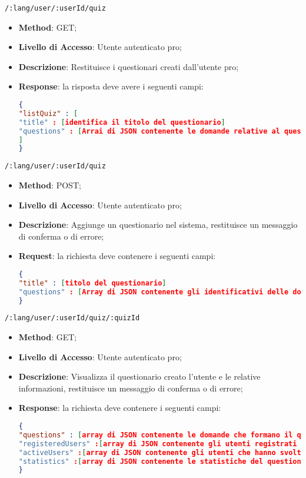 \item \texttt{/:lang/user/:userId/quiz}
	\begin{itemize}
		\item \textbf{Method}: GET;
		\item \textbf{Livello di Accesso}: Utente autenticato pro;
		\item \textbf{Descrizione}: Restituisce i questionari creati dall'utente pro;
		\item \textbf{Response}: la risposta deve avere i seguenti campi:
\begin{lstlisting}[language=json,firstnumber=1]
{
"listQuiz" : [ 
"title" : [identifica il titolo del questionario]
"questions" : [Arrai di JSON contenente le domande relative al questionario]
]
}
\end{lstlisting}
	\end{itemize}	
	
	
	\item \texttt{/:lang/user/:userId/quiz}
		\begin{itemize}
			\item \textbf{Method}: POST;
			\item \textbf{Livello di Accesso}: Utente autenticato pro;
			\item \textbf{Descrizione}: Aggiunge un questionario nel sistema, restituisce un messaggio di conferma o di errore;
			\item \textbf{Request}: la richiesta deve contenere i seguenti campi:
\begin{lstlisting}[language=json,firstnumber=1]
{
"title" : [titolo del questionario]
"questions" : [Array di JSON contenente gli identificativi delle domande che compongono il questionario]
}
\end{lstlisting}
		\end{itemize}
		
	\item \texttt{/:lang/user/:userId/quiz/:quizId}
	\begin{itemize}
		\item \textbf{Method}: GET;
		\item \textbf{Livello di Accesso}: Utente autenticato pro;
		\item \textbf{Descrizione}: Visualizza il questionario creato l'utente e le relative informazioni, restituisce un messaggio di conferma o di errore;
		\item \textbf{Response}: la richiesta deve contenere i seguenti campi:
\begin{lstlisting}[language=json,firstnumber=1]
{
"questions" : [array di JSON contenente le domande che formano il questionario]
"registeredUsers" :[array di JSON contenente gli utenti registrati al questionario]
"activeUsers" :[array di JSON contenente gli utenti che hanno svolto il questionario]
"statistics" :[array di JSON contenente le statistiche del questionario]
}
\end{lstlisting}
	\end{itemize}		
		
